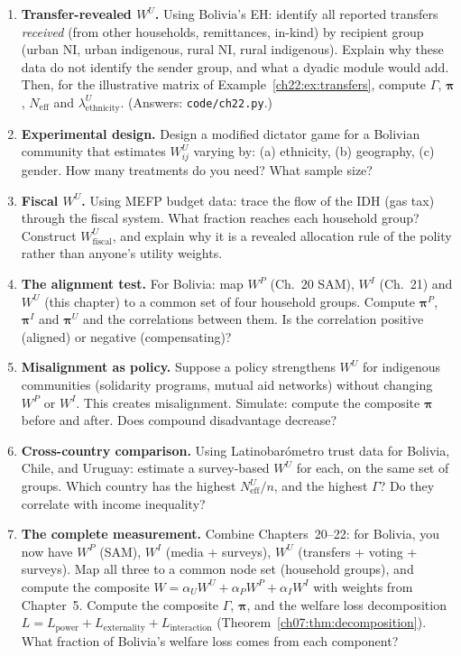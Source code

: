 \documentclass[../structural_economics_book.tex]{subfiles}
\begin{document}
\begin{enumerate}[label=\textbf{22.\arabic*}, leftmargin=3em]

\item \textbf{Transfer-revealed $W^U$.} Using Bolivia's EH: identify all reported transfers \emph{received} (from other households, remittances, in-kind) by recipient group (urban NI, urban indigenous, rural NI, rural indigenous). Explain why these data do not identify the sender group, and what a dyadic module would add. Then, for the illustrative matrix of Example~\ref{ch22:ex:transfers}, compute $\Gamma$, $\boldsymbol{\pi}$, $N_{\text{eff}}$ and $\lambda^U_{\text{ethnicity}}$. (Answers: \texttt{code/ch22.py}.)

\item \textbf{Experimental design.} Design a modified dictator game for a Bolivian community that estimates $W^U_{ij}$ varying by: (a) ethnicity, (b) geography, (c) gender. How many treatments do you need? What sample size?

\item \textbf{Fiscal $W^U$.} Using MEFP budget data: trace the flow of the IDH (gas tax) through the fiscal system. What fraction reaches each household group? Construct $W^U_{\text{fiscal}}$, and explain why it is a revealed allocation rule of the polity rather than anyone's utility weights.

\item \textbf{The alignment test.} For Bolivia: map $W^P$ (Ch.~20 SAM), $W^I$ (Ch.~21) and $W^U$ (this chapter) to a common set of four household groups. Compute $\boldsymbol{\pi}^P$, $\boldsymbol{\pi}^I$ and $\boldsymbol{\pi}^U$ and the correlations between them. Is the correlation positive (aligned) or negative (compensating)?

\item \textbf{Misalignment as policy.} Suppose a policy strengthens $W^U$ for indigenous communities (solidarity programs, mutual aid networks) without changing $W^P$ or $W^I$. This creates misalignment. Simulate: compute the composite $\boldsymbol{\pi}$ before and after. Does compound disadvantage decrease?

\item \textbf{Cross-country comparison.} Using Latinobar\'{o}metro trust data for Bolivia, Chile, and Uruguay: estimate a survey-based $W^U$ for each, on the same set of groups. Which country has the highest $N_{\text{eff}}^U/n$, and the highest $\Gamma$? Do they correlate with income inequality?

\item \textbf{The complete measurement.} Combine Chapters~20--22: for Bolivia, you now have $W^P$ (SAM), $W^I$ (media + surveys), $W^U$ (transfers + voting + surveys). Map all three to a common node set (household groups), and compute the composite $W = \alpha_U W^U + \alpha_P W^P + \alpha_I W^I$ with weights from Chapter~5. Compute the composite $\Gamma$, $\boldsymbol{\pi}$, and the welfare loss decomposition $L = L_{\text{power}} + L_{\text{externality}} + L_{\text{interaction}}$ (Theorem~\ref{ch07:thm:decomposition}). What fraction of Bolivia's welfare loss comes from each component?
\end{enumerate}
\end{document}
